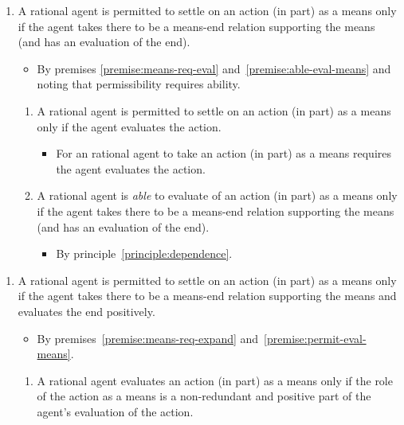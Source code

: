\documentclass[10pt]{article}
\begin{document}
\begin{enumerate}[label=P\arabic*., ref=(P\arabic*)]
\item\label{premise:permit-eval-means} A rational agent is permitted to settle on an action (in part) as a means only if the agent takes there to be a means-end relation supporting the means (and has an evaluation of the end).
    \begin{itemize}
    \item By premises \ref{premise:means-req-eval} and~\ref{premise:able-eval-means} and noting that permissibility requires ability.
    \end{itemize}
  \begin{enumerate}[label=P\arabic{enumi}\alph*., ref=(P\arabic{enumi}\alph*)]
  \item\label{premise:means-req-eval} A rational agent is permitted to settle on an action (in part) as a means only if the agent evaluates the action.
    \begin{itemize}
    \item For an rational agent to take an action (in part) as a means requires the agent evaluates the action.
    \end{itemize}
  \item\label{premise:able-eval-means} A rational agent is \emph{able} to evaluate of an action (in part) as a means only if the agent takes there to be a means-end relation supporting the means (and has an evaluation of the end).
    \begin{itemize}
    \item By principle~\ref{principle:dependence}.
    \end{itemize}
  \end{enumerate}
\end{enumerate}

\begin{enumerate}[label=P\arabic*., ref=(P\arabic*), resume]
\item A rational agent is permitted to settle on an action (in part) as a means only if the agent takes there to be a means-end relation supporting the means and evaluates the end positively.
  \begin{itemize}
  \item By premises~\ref{premise:means-req-expand} and~\ref{premise:permit-eval-means}.
  \end{itemize}
  \begin{enumerate}[label=P\arabic{enumi}\alph*., ref=(P\arabic{enumi}\alph*)]
  \item\label{premise:means-req-expand} A rational agent evaluates an action (in part) as a means only if the role of the action as a means is a non-redundant and positive part of the agent’s evaluation of the action.
  \end{enumerate}
\end{enumerate}
\end{document}
